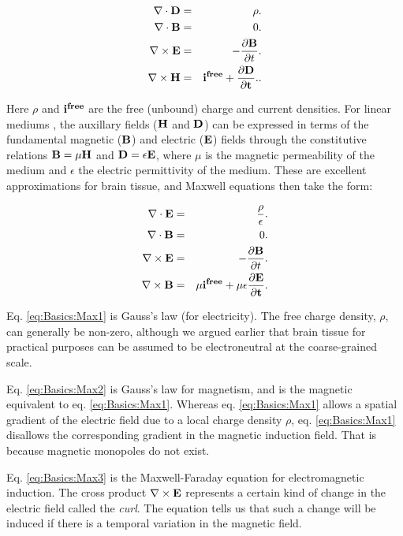 \begin{eqnarray}
\nabla\cdot {\bf D} & = & \rho. \label{eq:Basics:Max11} \\
\nabla \cdot {\bf B} & = & 0.  \label{eq:Basics:Max22} \\
\nabla \times {\bf E} & = & - \frac{\partial {\bf B}}{\partial t}.  \label{eq:Basics:Max33} \\
\nabla \times {\bf H} & = & \bf{i^{free}} + \frac{\partial {\bf D}}{\partial t}.  \label{eq:Basics:Max44}.
\end{eqnarray}

Here $\rho$ and $\bf{i^{free}}$ are the free (unbound) charge and current densities. For linear mediums , the auxillary fields (${\bf H}$ and ${\bf D}$) can be expressed in terms of the fundamental magnetic (${\bf B}$) and electric (${\bf E}$) fields through the constitutive relations ${\bf B} = \mu{\bf H}$ and ${\bf D} = \epsilon {\bf E}$, where $\mu$ is the magnetic permeability of the medium and $\epsilon$ the electric permittivity of the medium. These are excellent approximations for brain tissue, and Maxwell equations then take the form:

\begin{eqnarray}
\nabla\cdot {\bf E} & = & \frac{\rho}{\epsilon}. \label{eq:Basics:Max1} \\
\nabla \cdot {\bf B} & = & 0.  \label{eq:Basics:Max2} \\
\nabla \times {\bf E} & = & - \frac{\partial {\bf B}}{\partial t}.  \label{eq:Basics:Max3} \\
\nabla \times {\bf B} & = & \mu\bf{i}^{free} + \mu\epsilon\frac{\partial {\bf E}}{\partial t}.  \label{eq:Basics:Max4}
\end{eqnarray}

Eq. \ref{eq:Basics:Max1} is Gauss's law (for electricity). The free charge density, $\rho$, can generally be non-zero, although we argued earlier that brain tissue for practical purposes can be assumed to be electroneutral at the coarse-grained scale. 

Eq. \ref{eq:Basics:Max2} is Gauss's law for magnetism, and is the magnetic equivalent to eq. \ref{eq:Basics:Max1}. Whereas eq. \ref{eq:Basics:Max1} allows a spatial gradient of the electric field due to a local charge density $\rho$, eq. \ref{eq:Basics:Max1} disallows the corresponding gradient in the magnetic induction field. That is because magnetic monopoles do not exist. 

Eq. \ref{eq:Basics:Max3} is the Maxwell-Faraday equation for electromagnetic induction. The cross product $\nabla \times {\bf E}$ represents a certain kind of change in the electric field called the \textit{curl}. The equation tells us that such a change will be induced if there is a temporal variation in the magnetic field. 

